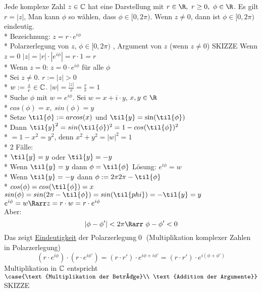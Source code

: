 Jede komplexe Zahl $z \in \text{$\mathbb{C}$}$ hat eine Darstellung  mit $r \in \R,\ r \geq 0,\ \phi \in \R$. Es gilt $r= |z|$, Man kann $\phi$ so wählen, dass $\phi \in [0, 2\pi)$. Wenn $z \neq 0$, dann ist $\phi \in [0, 2\pi)$ eindeutig.\\*
Bezeichnung: $z = r \cdot e^{i\phi}$\\*
Polarzerlegung von $z$, $\phi \in [0, 2\pi)$ , Argument von $z$ (wenn $z \neq 0$)
SKIZZE
\bew
Wenn $z = 0$ \Rarr{} $|z| = |r| \cdot |e^{i\phi}| = r \cdot 1 = r$\\*
Wenn $z = 0$: $z = 0 \cdot e^{i \phi}$ für alle $\phi$\\*
Sei $z \neq 0$. $r := |z| > 0$\\*
$w:= \frac{z}{r} \in \text{$\mathbb{C}$}$. $|w| = \frac{|z|}{r} = \frac{r}{r} = 1$\\*
Suche $\phi$ mit $w = e^{i \phi}$. Sei $w = x + i \cdot y$, $x,y \in \R$\\*
$cos(\phi) = x,\ sin(\phi) = y$\\*
Setze $\til{\phi} := arcos(x)$ und $\til{y} = \sin(\til{\phi})$\\*
Dann $\til{y}^2 = sin(\til{\phi})^2 = 1 - cos(\til{\phi})^2$\\*
$= 1 - x^2 =  y^2$, denn $x^2 + y^2 = |w|^2 = 1$\\*
2 Fälle:\\*
$\til{y} = y$ oder $\til{y} = -y$\\*
Wenn $\til{y} = y$ dann $\phi = \til{\phi}$ Lösung: $e^{i\phi} = w$\\*
Wenn $\til{y} = -y$ dann $\phi := 2\pi 2\pi - \til{\phi}$\\*
$cos(\phi) = cos(\til{\phi}) = x$ \ok\\
$sin(\phi) = sin(2\pi - \til{\phi}) = sin(\til{phi}) = -\til{y} = y$ \ok\\
\Rarr{} $e^{i\phi} = w \Rarr z = r \cdot w = r \cdot e^{i\phi}$\\
Aber:
$$|\phi-\phi'| < 2 \pi \Rarr\ \phi-\phi'<0$$
Das zeigt \ul{Eindeutigkeit} der Polarzerlegung\qed
\bem
(Multiplikation komplexer Zahlen in Polarzerlegung)
$$(r·e^{i\phi})·(r·e^{i\phi'})=(r·r')·e^{i\phi+i\phi'}=(r·r')·e^{i(\phi+\phi')}$$
Multiplikation in $\text{$\mathbb{C}$}$ entspricht $\case{\text{Multiplikation der Beträge}\\ \text{Addition der Argumente}}$ SKIZZE

